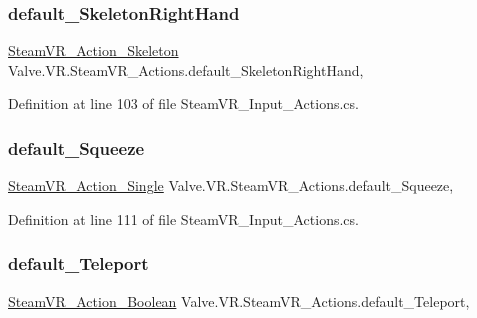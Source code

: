 \subsubsection{\texorpdfstring{default\_SkeletonRightHand}{default\_SkeletonRightHand}}
{\footnotesize\ttfamily \mbox{\hyperlink{class_valve_1_1_v_r_1_1_steam_v_r___action___skeleton}{Steam\+V\+R\+\_\+\+Action\+\_\+\+Skeleton}} Valve.\+V\+R.\+Steam\+V\+R\+\_\+\+Actions.\+default\+\_\+\+Skeleton\+Right\+Hand\hspace{0.3cm}{\ttfamily [static]}, {\ttfamily [get]}}



Definition at line 103 of file Steam\+V\+R\+\_\+\+Input\+\_\+\+Actions.\+cs.

\mbox{\label{class_valve_1_1_v_r_1_1_steam_v_r___actions_a1fa58841fd9ce6dd449502fa74b382f2}} 
\subsubsection{\texorpdfstring{default\_Squeeze}{default\_Squeeze}}
{\footnotesize\ttfamily \mbox{\hyperlink{class_valve_1_1_v_r_1_1_steam_v_r___action___single}{Steam\+V\+R\+\_\+\+Action\+\_\+\+Single}} Valve.\+V\+R.\+Steam\+V\+R\+\_\+\+Actions.\+default\+\_\+\+Squeeze\hspace{0.3cm}{\ttfamily [static]}, {\ttfamily [get]}}



Definition at line 111 of file Steam\+V\+R\+\_\+\+Input\+\_\+\+Actions.\+cs.

\mbox{\label{class_valve_1_1_v_r_1_1_steam_v_r___actions_a23caf99ba559eadf758e34ac693af761}} 
\subsubsection{\texorpdfstring{default\_Teleport}{default\_Teleport}}
{\footnotesize\ttfamily \mbox{\hyperlink{class_valve_1_1_v_r_1_1_steam_v_r___action___boolean}{Steam\+V\+R\+\_\+\+Action\+\_\+\+Boolean}} Valve.\+V\+R.\+Steam\+V\+R\+\_\+\+Actions.\+default\+\_\+\+Teleport\hspace{0.3cm}{\ttfamily [static]}, {\ttfamily [get]}}




